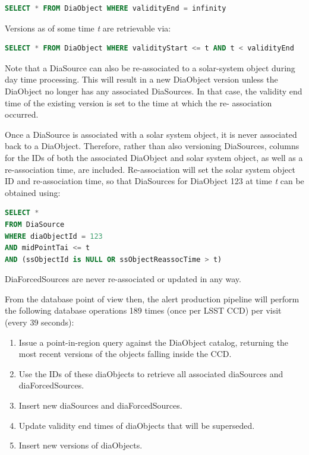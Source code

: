 \documentclass[DM,lsstdraft,toc]{lsstdoc}
\begin{document}
\begin{lstlisting}[language=SQL]
SELECT * FROM DiaObject WHERE validityEnd = infinity
\end{lstlisting}

Versions as of some time \emph{t} are retrievable via:

\begin{lstlisting}[language=SQL]
SELECT * FROM DiaObject WHERE validityStart <= t AND t < validityEnd
\end{lstlisting}

Note that a DiaSource can also be re-associated to a solar-system object
during day time processing. This will result in a new DiaObject version unless
the DiaObject no longer has any associated DiaSources. In that case, the
validity end time of the existing version is set to the time at which the re-
association occurred.

Once a DiaSource is associated with a solar system object, it is never
associated back to a DiaObject. Therefore, rather than also versioning
DiaSources, columns for the IDs of both the associated DiaObject and solar
system object, as well as a re-association time, are included. Re-association
will set the solar system object ID and re-association time, so that
DiaSources for DiaObject 123 at time \emph{t} can be obtained using:

\begin{lstlisting}[language=SQL]
SELECT *
FROM DiaSource
WHERE diaObjectId = 123
AND midPointTai <= t
AND (ssObjectId is NULL OR ssObjectReassocTime > t)
\end{lstlisting}

DiaForcedSources are never re-associated or updated in any way.

From the database point of view then, the alert production pipeline will
perform the following database operations 189 times (once per LSST CCD) per
visit (every 39 seconds):

\begin{enumerate}
\def\labelenumi{\arabic{enumi}.}
\item
  Issue a point-in-region query against the DiaObject catalog, returning
  the most recent versions of the objects falling inside the CCD.
\item
  Use the IDs of these diaObjects to retrieve all associated diaSources
  and diaForcedSources.
\item
  Insert new diaSources and diaForcedSources.
\item
  Update validity end times of diaObjects that will be superseded.
\item
  Insert new versions of diaObjects.
\end{enumerate}
\end{document}
